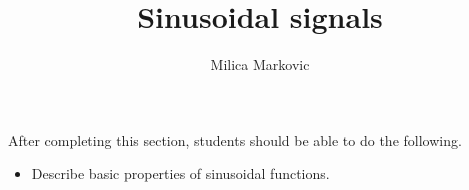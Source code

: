 \documentclass{ximera}
\title{Sinusoidal signals}
\author{Milica Markovic}
\begin{document}
\begin{abstract}
\end{abstract}

\maketitle


\begin{sectionOutcomes}
After completing this section, students should be able to do the following.
\begin{itemize}

\item Describe basic properties of sinusoidal functions.

\end{itemize}
\end{sectionOutcomes}
\end{document}
